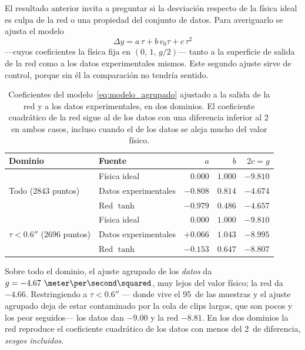 \documentclass[titlepage,11pt]{article}
\providecommand{\num}[1]{\ensuremath{#1}}
\providecommand{\SI}[2]{#1\,#2}
\providecommand{\percent}{\char37\relax}
\begin{document}
El resultado anterior invita a preguntar si la desviación respecto de la física
ideal es culpa de la red o una propiedad del conjunto de datos. Para
averiguarlo se ajusta el modelo
\begin{equation}
  \Delta y = a\,\tau + b\,v_0\tau + c\,\tau^2
  \label{eq:modelo_agrupado}
\end{equation}
---cuyos coeficientes la física fija en $(0,\,1,\,g/2)$--- tanto a la
superficie de salida de la red como a los datos experimentales mismos. Este
segundo ajuste sirve de control, porque sin él la comparación no tendría
sentido.

\begin{table}
  \centering
  \begin{tabular}{llrrr}
    \toprule
    Dominio & Fuente & $a$ & $b$ & $2c = g$ \\
    \midrule
    \multirow{3}{*}{Todo ($\num{2843}$ puntos)}
      & Física ideal & $0.000$ & $1.000$ & $-9.810$ \\
      & Datos experimentales & $-0.808$ & $0.814$ & $-4.674$ \\
      & Red $\tanh$ & $-0.979$ & $0.486$ & $\mathbf{-4.657}$ \\
    \midrule
    \multirow{3}{*}{$\tau<\unit{0.6}{\second}$ ($\num{2696}$ puntos)}
      & Física ideal & $0.000$ & $1.000$ & $-9.810$ \\
      & Datos experimentales & $+0.066$ & $1.043$ & $-8.995$ \\
      & Red $\tanh$ & $-0.153$ & $0.647$ & $\mathbf{-8.807}$ \\
    \bottomrule
  \end{tabular}
  \caption{Coeficientes del modelo~\eqref{eq:modelo_agrupado} ajustado a la
    salida de la red y a los datos experimentales, en dos dominios. El
    coeficiente cuadrático de la red sigue al de los datos con una diferencia
    inferior al \SI{2}{\percent} en ambos casos, incluso cuando el de los datos
    se aleja mucho del valor físico.}
  \label{tab:ecuacion}
\end{table}

Sobre todo el dominio, el ajuste agrupado de los
\emph{datos} da $g=\num{-4.67}~\meter\per\second\squared$, muy lejos del valor
físico; la red da $\num{-4.66}$. Restringiendo a $\tau<\unit{0.6}{\second}$ ---
donde vive el \SI{95}{\percent} de las muestras y el ajuste agrupado deja de
estar contaminado por la cola de clips largos, que son pocos y los peor
seguidos--- los datos dan $\num{-9.00}$ y la red $\num{-8.81}$. En los dos
dominios la red reproduce el coeficiente cuadrático de los datos con menos del
\SI{2}{\percent} de diferencia, \emph{sesgos incluidos}.
\end{document}
